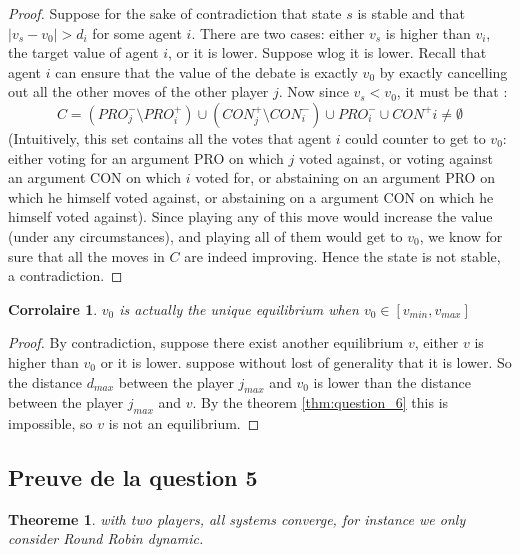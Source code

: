 \documentclass[12pt]{article}
\newtheorem{theoreme}{Theoreme}[section]
\newtheorem{corollary}{Corrolaire}[section]
\theoremstyle{defi}
\theoremstyle{not}
\theoremstyle{prob}
\begin{document}
    \begin{proof}
    Suppose for the sake of contradiction that state $s$ is stable and that $|v_s - v_0| > d_i$ for some agent $i$. There are two cases: either $v_s$ is higher than $v_i$, the target value of agent $i$, or it is lower. Suppose wlog it is lower.
    Recall that agent $i$ can ensure that the value of the debate is exactly $v_0$ by exactly cancelling out all the other moves of the other player $j$.
    Now since $v_s<v_0$, it must be that :
    $$
    C = (PRO^-_j \setminus PRO^+_i) \cup (CON^+_j \setminus CON^-_i) \cup PRO^-_i \cup CON^+i \not = \emptyset
    $$
    (Intuitively, this set contains all the votes that agent $i$ could counter to get to $v_0$: either voting for an argument PRO on which $j$ voted against, or voting against an argument CON on which $i$ voted for, or abstaining on an argument PRO on which he himself voted against, or abstaining on a argument CON on which he himself voted against).
    Since playing any of this move would increase the value (under any circumstances), and playing all of them would get to $v_0$, we know for sure that all the moves in $C$ are indeed improving. Hence the state is not stable, a contradiction.
    \end{proof}

    \begin{corollary}
      $v_0$ is actually the \emph{unique} equilibrium when $v_0 \in [v_{min},v_{max}]$
    \end{corollary}

    \begin{proof}
      By contradiction, suppose there exist another equilibrium $v$, either $v$ is higher than $v_0$ or it is lower. suppose without lost of generality that it is lower. So the distance $d_{max}$ between the player $j_{max}$ and $v_0$ is lower than the distance between the player $j_{max}$ and $v$. By the theorem \ref{thm:question_6} this is impossible, so $v$ is not an equilibrium.
    \end{proof}

    \subsection{Preuve de la question 5}

      \begin{theoreme}
        \label{thm:question_5}
        with two players, all systems converge, for instance we only consider Round Robin dynamic.
      \end{theoreme}
\end{document}
